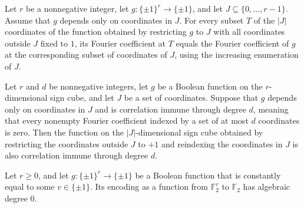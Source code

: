 \begin{theorem}
\label{FABL.fourierCoeff_juntaWitnessCore}
\leanok
{}
Let $r$ be a nonnegative integer, let $g:\{\pm1\}^r\to\{\pm1\}$, and let
$J\subseteq\{0,\ldots,r-1\}$. Assume that $g$ depends only on coordinates in $J$. For
every subset $T$ of the $|J|$ coordinates of the function obtained by restricting $g$ to
$J$ with all coordinates outside $J$ fixed to $1$, its Fourier coefficient at $T$ equals
the Fourier coefficient of $g$ at the corresponding subset of coordinates of $J$, using
the increasing enumeration of $J$.
\end{theorem}

\begin{theorem}
\label{FABL.juntaWitnessCore_isCorrelationImmune}
\leanok
{}
Let $r$ and $d$ be nonnegative integers, let $g$ be a Boolean function on the
$r$-dimensional sign cube, and let $J$ be a set of coordinates. Suppose that $g$ depends
only on coordinates in $J$ and is correlation immune through degree $d$, meaning that
every nonempty Fourier coefficient indexed by a set of at most $d$ coordinates is zero.
Then the function on the $|J|$-dimensional sign cube obtained by restricting the
coordinates outside $J$ to $+1$ and reindexing the coordinates in $J$ is also
correlation immune through degree $d$.
\end{theorem}

\begin{theorem}
\label{FABL.functionAlgebraicDegree_encoding_eq_zero_of_eq_const}
\leanok
{}
Let $r\ge 0$, and let $g:\{\pm1\}^r\to\{\pm1\}$ be a Boolean function that is constantly
equal to some $v\in\{\pm1\}$. Its encoding as a function from $\mathbb{F}_2^r$ to
$\mathbb{F}_2$ has algebraic degree $0$.
\end{theorem}

